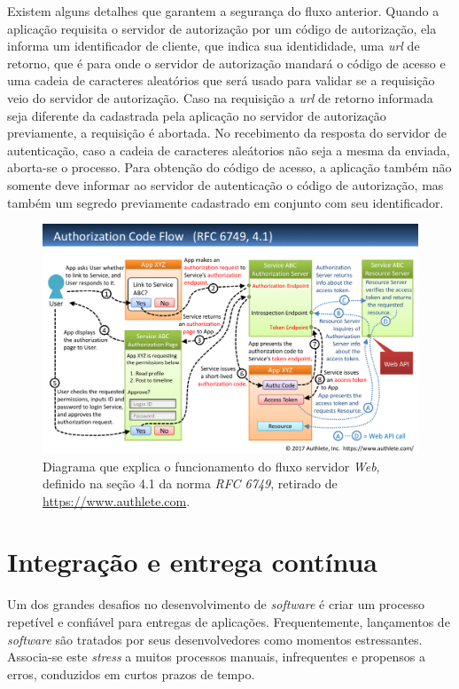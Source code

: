   Existem alguns detalhes que garantem a segurança do fluxo anterior. Quando a aplicação requisita 
  o servidor de autorização por um código de autorização, ela informa um identificador de cliente, que 
  indica sua identididade, uma \emph{url} de retorno, que é para onde o servidor de autorização mandará 
  o código de acesso e uma cadeia de caracteres aleatórios que será usado para validar se a requisição 
  veio do servidor de autorização. Caso na requisição a \emph{url} de retorno informada seja diferente 
  da cadastrada pela aplicação no servidor de autorização previamente, a requisição é abortada. No 
  recebimento da resposta do servidor de autenticação, caso a cadeia de caracteres aleátorios não seja a mesma 
  da enviada, aborta-se o processo. Para obtenção do código de acesso, a aplicação também não somente deve informar 
  ao servidor de autenticação o código de autorização, mas também um segredo previamente cadastrado em conjunto 
  com seu identificador.
  \begin{figure}[htpb]
    \centering
    \includegraphics[width=0.95\linewidth]{images/web_flow.png}
    \caption{Diagrama que explica o funcionamento do fluxo servidor \emph{Web}, 
      definido na seção 4.1 da norma \emph{RFC 6749}, retirado de \url{https://www.authlete.com}.}%
    \label{fig:web_flow}
  \end{figure}
  

  \section{Integração e entrega contínua}
  Um dos grandes desafios no desenvolvimento de \emph{software} é criar um processo repetível e 
  confiável para entregas de aplicações. Frequentemente, lançamentos de \emph{software} são
  tratados por seus desenvolvedores como momentos estressantes. Associa-se este \emph{stress} a
  muitos processos manuais, infrequentes e propensos a erros, conduzidos em curtos prazos 
  de tempo.
  
